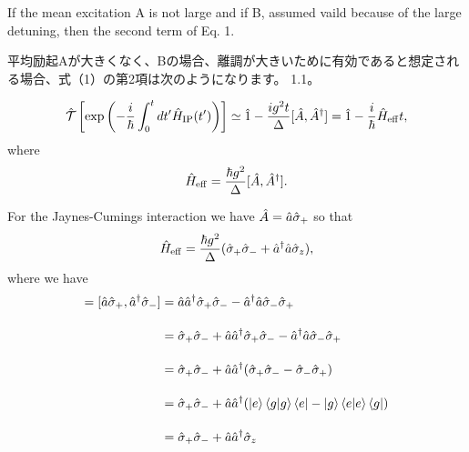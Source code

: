 If the mean excitation A is not large and if B, assumed vaild because of the large detuning, then the second term of Eq. 1.



平均励起Aが大きくなく、Bの場合、離調が大きいために有効であると想定される場合、式（1）の第2項は次のようになります。 1.1。

\begin{equation}
    \hat{\mathcal{T}}\left[
    \exp{\left(
    -\frac{i}{\hbar}\int_0^t dt^\prime \hat{H}_{\rm{IP}}(t^\prime)
    \right)}
    \right]
    \simeq
    \hat{1}-\frac{ig^2t}{\Delta}[\hat{A},\hat{A}^\dagger]
    =\hat{1}-\frac{i}{\hbar}\hat{H}_{\rm{eff}}t,
\end{equation}
where
\begin{equation}
    \hat{H}_{\rm{eff}}=\frac{\hbar g^2}{\Delta}[\hat{A},\hat{A}^\dagger].
\end{equation}

For the Jaynes-Cumings interaction we have $\hat{A}=\hat{a}{\hat{\sigma}}_+$ so that
\begin{equation}
    \hat{H}_{\rm{eff}}=\frac{\hbar g^2}{\Delta}({\hat{\sigma}}_+{\hat{\sigma}}_-
    +\hat{a}^\dagger\hat{a}{\hat{\sigma}}_z),
\end{equation}
where we have
\begin{align}
    [\hat{A}, \hat{A}^\dagger]=[\hat{a}\hsig_+,\hat{a}^\dagger\hsig_-]
    &=\hat{a}\hat{a}^\dagger\hsig_+\hsig_-
    -\hat{a}^\dagger\hat{a}\hsig_-\hsig_+\nn[10pt]
    &=\hsig_+\hsig_-+\hat{a}\hat{a}^\dagger\hsig_+\hsig_-
    -\hat{a}^\dagger\hat{a}\hsig_-\hsig_+\nn[10pt]
    &=\hsig_+\hsig_-+\hat{a}\hat{a}^\dagger(\hsig_+\hsig_-
    -\hsig_-\hsig_+)\nn[10pt]
    &=\hsig_+\hsig_-+\hat{a}\hat{a}^\dagger(\ket{e}\braket{g|g}\bra{e}
    -\ket{g}\braket{e|e}\bra{g})\nn[10pt]
    &=\hsig_+\hsig_-+\hat{a}\hat{a}^\dagger\hsig_z
\end{align}






